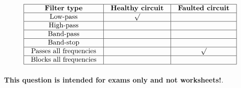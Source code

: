 $$\vbox{\offinterlineskip
\halign{\strut
\vrule \quad\hfil # \ \hfil & 
\vrule \quad\hfil # \ \hfil & 
\vrule \quad\hfil # \ \hfil \vrule \cr
\noalign{\hrule}
%
{\bf Filter type} & {\bf Healthy circuit} & {\bf Faulted circuit} \cr
%
\noalign{\hrule}
%
Low-pass & $\surd$ &  \cr
%
\noalign{\hrule}
%
High-pass &  &  \cr
%
\noalign{\hrule}
%
Band-pass &  &  \cr
%
\noalign{\hrule}
%
Band-stop &  &  \cr
%
\noalign{\hrule}
%
Passes all frequencies &  & $\surd$ \cr
%
\noalign{\hrule}
%
Blocks all frequencies &  &  \cr
%
\noalign{\hrule}
} %
}$$ %








{\bf This question is intended for exams only and not worksheets!}.



